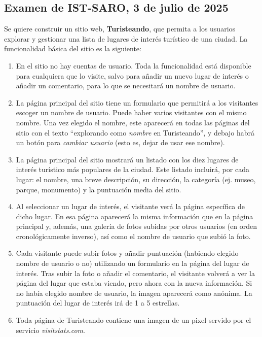 \subsection{Examen de IST-SARO, 3 de julio de 2025}

Se quiere construir un sitio web, {\bf Turisteando}, que permita a los usuarios explorar y gestionar una lista de lugares de interés turístico de una ciudad. La funcionalidad básica del sitio es la siguiente:

\begin{enumerate}
    \item En el sitio no hay cuentas de usuario. Toda la funcionalidad está disponible para cualquiera que lo visite, salvo para añadir un nuevo lugar de interés o añadir un comentario, para lo que se necesitará un nombre de usuario.
    \item La página principal del sitio tiene un formulario que permitirá a los visitantes escoger un nombre de usuario. Puede haber varios visitantes con el mismo nombre. Una vez elegido el nombre, este aparecerá en todas las páginas del sitio con el texto ``explorando como \emph{nombre} en Turisteando'', y debajo habrá un botón para \emph{cambiar usuario} (esto es, dejar de usar ese nombre).
    \item La página principal del sitio mostrará un listado con los diez lugares de interés turístico más populares de la ciudad. Este listado incluirá, por cada lugar: el nombre, una breve descripción, su dirección, la categoría (ej. museo, parque, monumento) y la puntuación media del sitio.
    \item Al seleccionar un lugar de interés, el visitante verá la página específica de dicho lugar. En esa página aparecerá la misma información que en la página principal y, además, una galería de fotos subidas por otros usuarios (en orden cronológicamente inverso), así como el nombre de usuario que subió la foto.
    \item Cada visitante puede subir fotos y añadir puntuación (habiendo elegido nombre de usuario o no) utilizando un formulario en la página del lugar de interés. Tras subir la foto o añadir el comentario, el visitante volverá a ver la página del lugar que estaba viendo, pero ahora con la nueva información. Si no había elegido nombre de usuario, la imagen aparecerá como anónima. La puntuación del lugar de interés irá de 1 a 5 estrellas.
    \item Toda página de Turisteando contiene una imagen de un pixel servido por el servicio \emph{visitstats.com}.
\end{enumerate}

